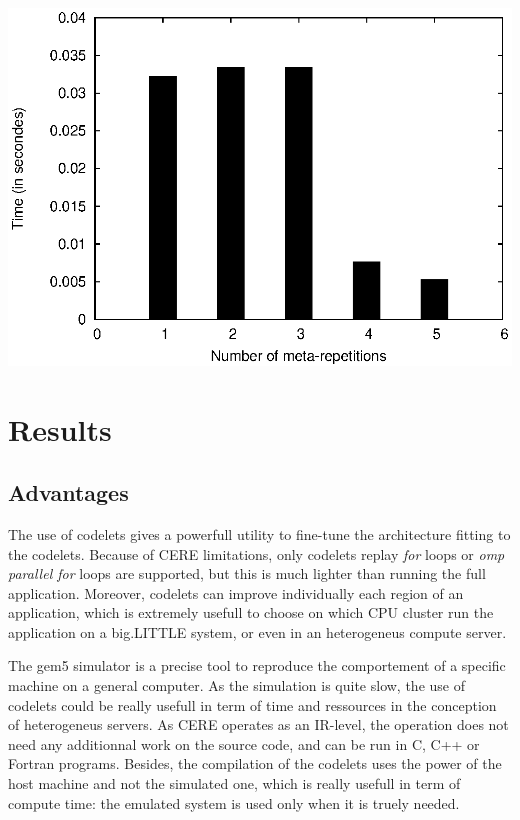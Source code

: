 \documentclass{article}
\newenvironment{Figure}
  {\par\medskip\noindent\minipage{\linewidth}}
  {\endminipage\par\bigskip\medskip}
\begin{document}
\begin{multicols}{2}
\begin{Figure}
\centering
\includegraphics[width=\linewidth]{nogood.eps}
\end{Figure}

\section{Results}
\subsection{Advantages}
The use of codelets gives a powerfull utility to fine-tune the architecture fitting to the codelets. Because of CERE limitations, only codelets replay \textit{for} loops or \textit{omp parallel for} loops are supported, but this is much lighter than running the full application. Moreover, codelets can improve individually each region of an application, which is extremely usefull to choose on which CPU cluster run the application on a big.LITTLE system, or even in an heterogeneus compute server.

The gem5 simulator is a precise tool to reproduce the comportement of a specific machine on a general computer. As the simulation is quite slow, the use of codelets could be really usefull in term of time and ressources in the conception of heterogeneus servers. As CERE operates as an IR-level, the operation does not need any additionnal work on the source code, and can be run in C, C++ or Fortran programs. Besides, the compilation of the codelets uses the power of the host machine and not the simulated one, which is really usefull in term of compute time: the emulated system is used only when it is truely needed.


\end{multicols}
\end{document}
